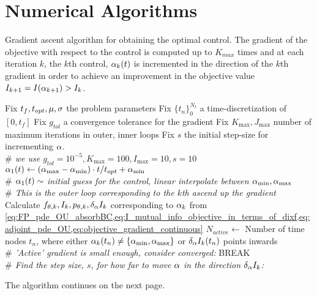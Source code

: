 \documentclass[12pt]{article}
\begin{document}
\section{Numerical Algorithms}
\begin{algorithm}
\begin{algorithmic}
\caption{Gradient ascent algorithm for obtaining the optimal control.
The gradient of the objective with respect to the control is computed up to
$K_{max}$ times and at each iteration $k$, the $k$th control, ${\alpha}_k(t)$ is incremented in
the direction of the $k$th gradient in order to achieve an improvement in the
objective value $I_{k+1}  = I({\alpha}_{k+1}) > I_k$.}
\label{alg:gradient_ascent_4_OC}
\State Fix $t_f, t_{opt}, {\mu }, {\sigma }$ the problem parameters
\State Fix $\{t_n\}_0^{N_t}$ a time-discretization of $[0,t_f]$
\State Fix $g_{tol}$ a convergence tolerance for the gradient
\State Fix $K_{\max}, J_{\max}$ number of maximum iterations in outer, inner
loops
\State Fix $s$ the initial step-size for incrementing ${\alpha}$. 
\\ {\itshape $\#$ we use $g_{tol}=10^{-5},K_{\max}=100,I_{\max}=10,s=10$}
\State ${\alpha}_1(t) \gets ({ {\alpha}_{\textrm{max}} }-{ {\alpha}_{\textrm{min}} }) \cdot t / t_{opt} + { {\alpha}_{\textrm{min}} }$ 
\\{\itshape  $\#$ ${\alpha}_1(t) \sim$ initial guess for the control, linear
interpolate between ${ {\alpha}_{\textrm{min}} }, { {\alpha}_{\textrm{max}} }$}
\\ {\itshape $\#$ This is the outer loop corresponding to the $k$th ascend up
the gradient} \State Calculate $f_{{\theta},k},I_{k},p_{{\theta},k}, \delta_{\alpha} I_k$ corresponding to ${\alpha}_k$ from
	\cref{eq:FP_pde_OU_absorbBC,eq:I_mutual_info_objective_in_terms_of_dixf,eq:adjoint_pde_OU,eq:objective_gradient_continuous}
	\State $N_{active}\gets$   Number of time nodes $t_n$, where either
	${\alpha}_k(t_n) \neq \{{ {\alpha}_{\textrm{min}} }, { {\alpha}_{\textrm{max}} }\}$ or $\delta_{\alpha} I_k(t_n)$ points inwards
		  \\ {\itshape  $\#$ 'Active' gradient is small enough,
		 consider converged:}
		 \State BREAK
	\EndIf
	\\ {\itshape $\#$ Find the step size, $s$, for how far to move ${\alpha}$ in the
	direction $\delta_{\alpha} I_k$:}
    \end{algorithmic}
    \end{algorithm}
The algorithm continues on the next page.  
\end{document}
